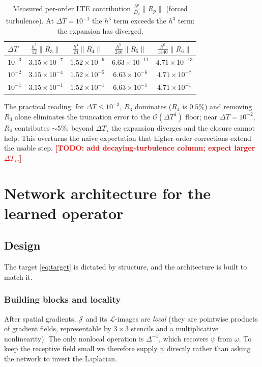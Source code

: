 \documentclass[11pt]{article}
\theoremstyle{plain}
\theoremstyle{definition}
\newcommand{\TODO}[1]{\textcolor{red}{\textbf{[TODO: #1]}}}
\newcommand{\Lop}{\mathcal{L}}
\newcommand{\Jop}{\mathcal{J}}
\newcommand{\bO}{\mathcal{O}}
\newcommand{\DT}{\Delta T}
\begin{document}
\begin{table}[h]
\centering\small
\caption{Measured per-order LTE contribution $\frac{h^p}{D_p}\|R_p\|$ (forced
turbulence). At $\DT=10^{-1}$ the $h^5$ term exceeds the $h^3$ term: the
expansion has diverged.}
\label{tab:lte}
\begin{tabular}{lcccc}
\toprule
$\DT$ & $\tfrac{h^3}{12}\|R_3\|$ & $\tfrac{h^4}{24}\|R_4\|$
      & $\tfrac{h^5}{240}\|R_5\|$ & $\tfrac{h^6}{1440}\|R_6\|$\\
\midrule
$10^{-3}$ & $3.15\!\times\!10^{-7}$ & $1.52\!\times\!10^{-9}$ & $6.63\!\times\!10^{-11}$ & $4.71\!\times\!10^{-13}$\\
$10^{-2}$ & $3.15\!\times\!10^{-4}$ & $1.52\!\times\!10^{-5}$ & $6.63\!\times\!10^{-6}$ & $4.71\!\times\!10^{-7}$\\
$10^{-1}$ & $3.15\!\times\!10^{-1}$ & $1.52\!\times\!10^{-1}$ & $6.63\!\times\!10^{-1}$ & $4.71\!\times\!10^{-1}$\\
\bottomrule
\end{tabular}
\end{table}

\noindent The practical reading: for $\DT\le10^{-3}$, $R_3$ dominates ($R_4$ is
$0.5\%$) and removing $R_3$ alone eliminates the truncation error to the
$\bO(\DT^4)$ floor; near $\DT=10^{-2}$, $R_4$ contributes $\sim5\%$; beyond
$\DT_\star$ the expansion diverges and the closure cannot help. This overturns
the naive expectation that higher-order corrections extend the usable step.
\TODO{add decaying-turbulence column; expect larger $\DT_\star$.}

\section{Network architecture for the learned operator}
\label{sec:arch}

\subsection{Design}
\label{sec:arch-design}
The target \eqref{eq:target} is dictated by structure, and the architecture is
built to match it.

\subsubsection{Building blocks and locality}
After spatial gradients, $\Jop$ and its $\Lop$-images are \emph{local} (they
are pointwise products of gradient fields, representable by $3\times3$ stencils
and a multiplicative nonlinearity). The only nonlocal operation is
$\Delta^{-1}$, which recovers $\psi$ from $\omega$. To keep the receptive field
small we therefore supply $\psi$ directly rather than asking the network to
invert the Laplacian.
\end{document}
